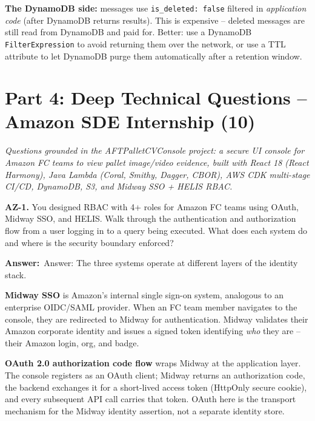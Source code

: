 \documentclass[letterpaper,10pt]{article}
\newlength{\boxwidth}
\newcommand{\answerlabel}{\noindent\textbf{\textcolor{answerblue}{Answer:}}~}
\begin{document}
\textbf{The DynamoDB side:} messages use \texttt{is\_deleted: false} filtered in \textit{application code} (after DynamoDB returns results). This is expensive -- deleted messages are still read from DynamoDB and paid for. Better: use a DynamoDB \texttt{FilterExpression} to avoid returning them over the network, or use a TTL attribute to let DynamoDB purge them automatically after a retention window.

\newpage

\section{Part 4: Deep Technical Questions -- Amazon SDE Internship (10)}

\noindent\textit{Questions grounded in the AFTPalletCVConsole project: a secure UI console for Amazon FC teams to view pallet image/video evidence, built with React 18 (React Harmony), Java Lambda (Coral, Smithy, Dagger, CBOR), AWS CDK multi-stage CI/CD, DynamoDB, S3, and Midway SSO + HELIS RBAC.}
\vspace{4pt}

\colorbox{qbg}{\begin{minipage}{\boxwidth}
\textbf{AZ-1.} You designed RBAC with 4+ roles for Amazon FC teams using OAuth, Midway SSO, and HELIS. Walk through the authentication and authorization flow from a user logging in to a query being executed. What does each system do and where is the security boundary enforced?
\end{minipage}}

\vspace{2pt}
\answerlabel{Answer:} The three systems operate at different layers of the identity stack.

\textbf{Midway SSO} is Amazon's internal single sign-on system, analogous to an enterprise OIDC/SAML provider. When an FC team member navigates to the console, they are redirected to Midway for authentication. Midway validates their Amazon corporate identity and issues a signed token identifying \textit{who} they are -- their Amazon login, org, and badge.

\textbf{OAuth 2.0 authorization code flow} wraps Midway at the application layer. The console registers as an OAuth client; Midway returns an authorization code, the backend exchanges it for a short-lived access token (HttpOnly secure cookie), and every subsequent API call carries that token. OAuth here is the transport mechanism for the Midway identity assertion, not a separate identity store.
\end{document}
